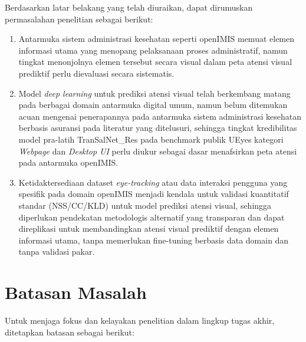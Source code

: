 Berdasarkan latar belakang yang telah diuraikan, dapat dirumuskan permasalahan penelitian sebagai berikut:
\begin{enumerate}
  \item Antarmuka sistem administrasi kesehatan seperti openIMIS memuat elemen informasi utama yang menopang pelaksanaan proses administratif, namun tingkat menonjolnya elemen tersebut secara visual dalam peta atensi visual prediktif perlu dievaluasi secara sistematis.
  \item Model \textit{deep learning} untuk prediksi atensi visual telah berkembang matang pada berbagai domain antarmuka digital umum, namun belum ditemukan acuan mengenai penerapannya pada antarmuka sistem administrasi kesehatan berbasis asuransi pada literatur yang ditelusuri, sehingga tingkat kredibilitas model pra-latih TranSalNet\_Res pada benchmark publik UEyes kategori \textit{Webpage} dan \textit{Desktop UI} perlu diukur sebagai dasar menafsirkan peta atensi pada antarmuka openIMIS.
  \item Ketidaktersediaan dataset \textit{eye-tracking} atau data interaksi pengguna yang spesifik pada domain openIMIS menjadi kendala untuk validasi kuantitatif standar (NSS/CC/KLD) untuk model prediksi atensi visual, sehingga diperlukan pendekatan metodologis alternatif yang transparan dan dapat direplikasi untuk membandingkan atensi visual prediktif dengan elemen informasi utama, tanpa memerlukan fine-tuning berbasis data domain dan tanpa validasi pakar.
\end{enumerate}

\section{Batasan Masalah}


Untuk menjaga fokus dan kelayakan penelitian dalam lingkup tugas akhir, ditetapkan batasan sebagai berikut:

